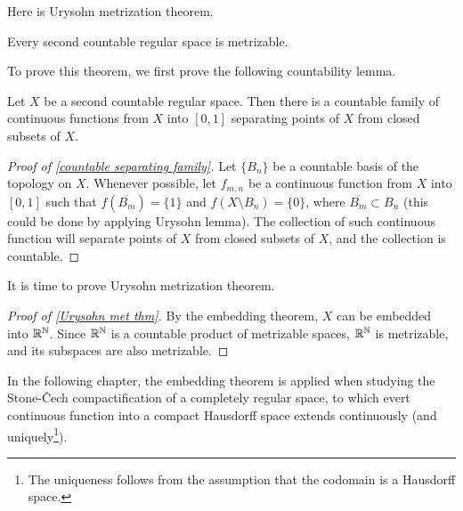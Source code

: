 Here is Urysohn metrization theorem.
\begin{thm}\label{Urysohn met thm}
    Every second countable regular space is metrizable.
\end{thm}

To prove this theorem, we first prove the following countability lemma.
\begin{lem}\label{countable separating family}
    Let $X$ be a second countable regular space.
    Then there is a countable family of continuous functions from $X$ into $[0, 1]$ separating points of $X$ from closed subsets of $X$.
\end{lem}
\begin{proof}[Proof of \cref{countable separating family}]
    Let $\{B_n\}$ be a countable basis of the topology on $X$.
    Whenever possible, let $f_{m, n}$ be a continuous function from $X$ into $[0, 1]$ such that $f(\overline{B_m})=\{1\}$ and $f(X\setminus B_n)=\{0\}$, where $\overline{B_m}\subset B_n$ (this could be done by applying Urysohn lemma).
    The collection of such continuous function will separate points of $X$ from closed subsets of $X$, and the collection is countable.
\end{proof}

It is time to prove Urysohn metrization theorem.
\begin{proof}[Proof of \cref{Urysohn met thm}]
    By the embedding theorem, $X$ can be embedded into ${\mathbb{R}}^{\mathbb{N}}$.
    Since ${\mathbb{R}}^{\mathbb{N}}$ is a countable product of metrizable spaces, ${\mathbb{R}}^{\mathbb{N}}$ is metrizable, and its subspaces are also metrizable.
\end{proof}

In the following chapter, the embedding theorem is applied when studying the Stone-\v{C}ech compactification of a completely regular space, to which evert continuous function into a compact Hausdorff space extends continuously (and uniquely\footnote{The uniqueness follows from the assumption that the codomain is a Hausdorff space.}).